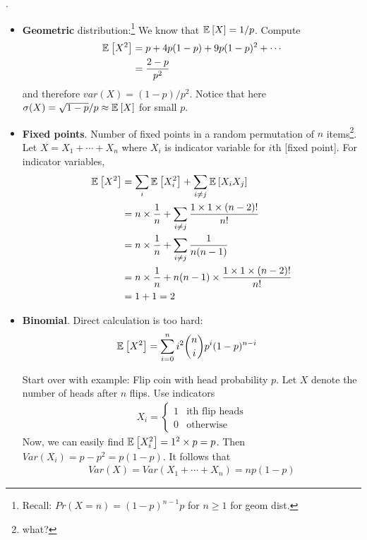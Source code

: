 \documentclass[12pt]{article}
\newcommand{\myspace}{\vspace{2\bigskipamount}}
\newcommand\p{\Needspace{12\baselineskip} \noindent}
\begin{document}
\myspace
\p {}. 
\begin{itemize}
	\item \textbf{Geometric} distribution:\footnote{Recall: $Pr(X = n)  = (1 - p)^{n - 1} p$ for $n \ge 1$ for geom dist.} We know that $\mathbb{E}_{}\left[X\right] = 1/p$. Compute
	\begin{align}
	\mathbb{E}_{}\left[X^2\right] &= p + 4p(1-p) + 9p(1-p)^2 + \cdots \\
	&= \frac{2 - p}{p^2}
	\end{align}
	and therefore $var(X) = (1-p)/p^2$. Notice that here $\sigma(X) = \sqrt{1-p}/p \approx \mathbb{E}_{}\left[X\right]$ for small $p$. 
	
	\item \textbf{Fixed points}. Number of fixed points in a random permutation of $n$ items\footnote{what?}. Let $X = X_1 + \cdots + X_n$ where $X_i$ is indicator variable for $i$th [fixed point]. For indicator variables,
	\begin{align}
	\mathbb{E}_{}\left[X^2\right] &= \sum_i \mathbb{E}_{}\left[X_i^2\right] + \sum_{i \ne j} \mathbb{E}_{}\left[X_i X_j\right] \\
	&= n \times \frac{1}{n} +  \sum_{i \ne j} \frac{1 \times 1 \times (n - 2)!}{n!} \\
	&=  n \times \frac{1}{n} +  \sum_{i \ne j} \frac{1}{n(n -1)} \\
	&=  n \times \frac{1}{n} + n(n -1) \times \frac{1 \times 1 \times (n - 2)!}{n!} \\
	&= 1 + 1 = 2
	\end{align}
	
	\item \textbf{Binomial}. Direct calculation is too hard:
	\begin{align}
		\mathbb{E}_{}\left[X^2\right] &= \sum_{i = 0}^n i^2 \binom{n}{i} p^i (1 - p)^{n - i}
	\end{align}
	
	Start over with example: Flip coin with head probability $p$. Let $X$ denote the number of heads after $n$ flips. Use indicators
	\begin{align}
		X_i = \begin{cases} 1 & \text{ith flip heads} \\ 0 & \text{otherwise} \end{cases}
	\end{align}
	Now, we can easily find $\mathbb{E}_{}\left[X_i^2\right] = 1^2 \times p = p$. Then $Var(X_i) = p - p^2 = p(1 - p)$. It follows that
	\begin{align}
		Var(X) = Var(X_1 + \cdots + X_n) = np(1 - p)
	\end{align}
	
\end{itemize}
\end{document}
